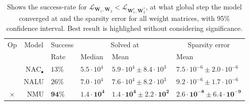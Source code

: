 \begin{table}[!h]

\caption{\label{tab:very-simple-function-results}Shows the success-rate for $\mathcal{L}_{\mathbf{W}_1, \mathbf{W}_2} < \mathcal{L}_{\mathbf{W}_1^\epsilon, \mathbf{W}_2^*}$, at what global step the model converged at and the sparsity error for all weight matrices, with 95\% confidence interval. Best result is highlighed without considering significance.}
\centering
\begin{tabular}{crllll}
\toprule
\multicolumn{1}{c}{Op} & \multicolumn{1}{c}{Model} & \multicolumn{1}{c}{Success} & \multicolumn{2}{c}{Solved at} & \multicolumn{1}{c}{Sparsity error} \\
\cmidrule(l{3pt}r{3pt}){1-1} \cmidrule(l{3pt}r{3pt}){2-2} \cmidrule(l{3pt}r{3pt}){3-3} \cmidrule(l{3pt}r{3pt}){4-5} \cmidrule(l{3pt}r{3pt}){6-6}
 &  & Rate & Median & Mean & Mean\\
\midrule
 & $\mathrm{NAC}_{\bullet}$ & $13\%$ & $5.5 \cdot 10^{4}$ & $5.9 \cdot 10^{4} \pm 8.4 \cdot 10^{3}$ & $7.5 \cdot 10^{-6} \pm 2.0 \cdot 10^{-6}$\\

 & NALU & $26\%$ & $7.0 \cdot 10^{4}$ & $7.6 \cdot 10^{4} \pm 8.2 \cdot 10^{3}$ & $9.2 \cdot 10^{-6} \pm 1.7 \cdot 10^{-6}$\\

\multirow{-3}{*}{\centering\arraybackslash $\bm{\times}$} & NMU & $\mathbf{94\%}$ & $\mathbf{1.4 \cdot 10^{4}}$ & $\mathbf{1.4 \cdot 10^{4} \pm 2.2 \cdot 10^{2}}$ & $\mathbf{2.6 \cdot 10^{-8} \pm 6.4 \cdot 10^{-9}}$\\
\bottomrule
\end{tabular}
\end{table}
